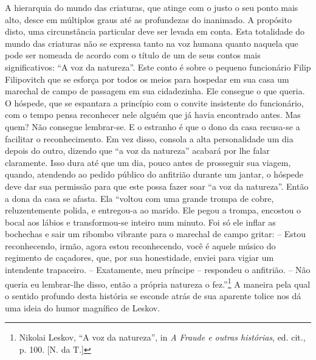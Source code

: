 A hierarquia do mundo das criaturas, que atinge com o justo o seu ponto
mais alto, desce em múltiplos graus até as profundezas do inanimado. A
propósito disto, uma circunstância particular deve ser levada em conta.
Esta totalidade do mundo das criaturas não se expressa tanto na voz
humana quanto naquela que pode ser nomeada de acordo com o título de um
de seus contos mais significativos: ``A voz da natureza''. Este conto é
sobre o pequeno funcionário Filip Filipovitch que se esforça por todos
os meios para hospedar em sua casa um marechal de campo de passagem em
sua cidadezinha. Ele consegue o que queria. O hóspede, que se espantara
a princípio com o convite insistente do funcionário, com o tempo pensa
reconhecer nele alguém que já havia encontrado antes. Mas quem? Não
consegue lembrar-se. E o estranho é que o dono da casa recusa-se a
facilitar o reconhecimento. Em vez disso, consola a alta personalidade
um dia depois do outro, dizendo que ``a voz da natureza'' acabará por
lhe falar claramente. Isso dura até que um dia, pouco antes de
prosseguir sua viagem, quando, atendendo ao pedido público do anfitrião
durante um jantar, o hóspede deve dar sua permissão para que este possa
fazer soar ``a voz da natureza''. Então a dona da casa se afasta. Ela
``voltou com uma grande trompa de cobre, reluzentemente polida, e
entregou-a ao marido. Ele pegou a trompa, encostou o bocal aos lábios e
transformou-se inteiro num minuto. Foi só ele inflar as bochechas e sair
um ribombo vibrante para o marechal de campo gritar: -- Estou
reconhecendo, irmão, agora estou reconhecendo, você é aquele músico do
regimento de caçadores, que, por sua honestidade, enviei para vigiar um
intendente trapaceiro. -- Exatamente, meu príncipe -- respondeu o
anfitrião. -- Não queria eu lembrar-lhe disso, então a própria natureza
o fez.''\footnote{Nikolai Leskov, ``A voz da natureza'', in \emph{A
  Fraude e outras histórias}, ed. cit., p. 100. {[}N. da T.{]}} A
maneira pela qual o sentido profundo desta história se esconde atrás de
sua aparente tolice nos dá uma ideia do humor magnífico de Leskov.

